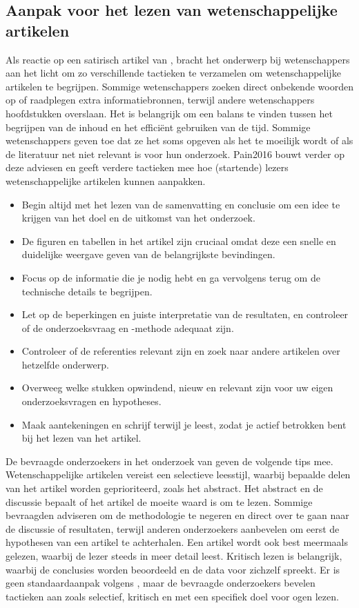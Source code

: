 \subsection{Aanpak voor het lezen van wetenschappelijke artikelen}

Als reactie op een satirisch artikel van \textcite{Ruben2016}, bracht \textcite{Pain2016} het onderwerp bij wetenschappers aan het licht om zo verschillende tactieken te verzamelen om wetenschappelijke artikelen te begrijpen. Sommige wetenschappers zoeken direct onbekende woorden op of raadplegen extra informatiebronnen, terwijl andere wetenschappers hoofdstukken overslaan. Het is belangrijk om een balans te vinden tussen het begrijpen van de inhoud en het efficiënt gebruiken van de tijd. Sommige wetenschappers geven toe dat ze het soms opgeven als het te moeilijk wordt of als de literatuur net niet relevant is voor hun onderzoek. {Pain2016} bouwt verder op deze adviesen en geeft verdere tactieken mee hoe (startende) lezers wetenschappelijke artikelen kunnen aanpakken.

\begin{itemize}
	\item Begin altijd met het lezen van de samenvatting en conclusie om een idee te krijgen van het doel en de uitkomst van het onderzoek.
	\item De figuren en tabellen in het artikel zijn cruciaal omdat deze een snelle en duidelijke weergave geven van de belangrijkste bevindingen.
	\item Focus op de informatie die je nodig hebt en ga vervolgens terug om de technische details te begrijpen.
	\item Let op de beperkingen en juiste interpretatie van de resultaten, en controleer of de onderzoeksvraag en -methode adequaat zijn.
	\item Controleer of de referenties relevant zijn en zoek naar andere artikelen over hetzelfde onderwerp.
	\item Overweeg welke stukken opwindend, nieuw en relevant zijn voor uw eigen onderzoeksvragen en hypotheses.
	\item Maak aantekeningen en schrijf terwijl je leest, zodat je actief betrokken bent bij het lezen van het artikel.
\end{itemize}

De bevraagde onderzoekers in het onderzoek van \textcite{Hubbard2017} geven de volgende tips mee. Wetenschappelijke artikelen vereist een selectieve leesstijl, waarbij bepaalde delen van het artikel worden geprioriteerd, zoals het abstract. Het abstract en de discussie bepaalt of het artikel de moeite waard is om te lezen. Sommige bevraagden adviseren om de methodologie te negeren en direct over te gaan naar de discussie of resultaten, terwijl anderen onderzoekers aanbevelen om eerst de hypothesen van een artikel te achterhalen. Een artikel wordt ook best meermaals gelezen, waarbij de lezer steeds in meer detail leest. Kritisch lezen is belangrijk, waarbij de conclusies worden beoordeeld en de data voor zichzelf spreekt. Er is geen standaardaanpak volgens \textcite{Hubbard2017}, maar de bevraagde onderzoekers bevelen tactieken aan zoals selectief, kritisch en met een specifiek doel voor ogen lezen.

